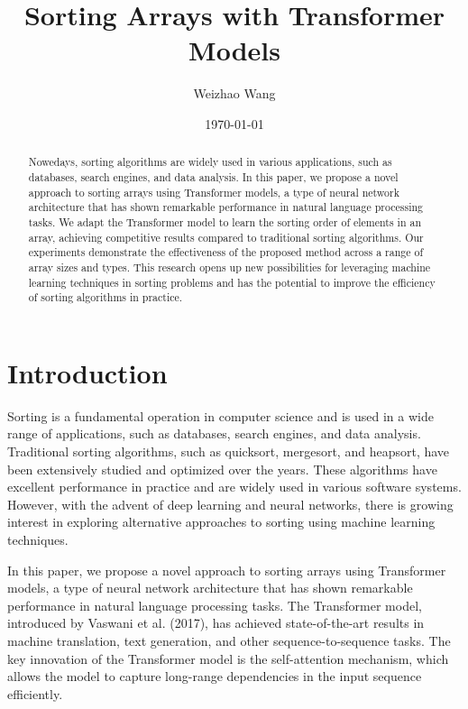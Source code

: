 \documentclass{article}
\author{Weizhao Wang}
\date{\today}
\begin{document}
\title{Sorting Arrays with Transformer Models}

\maketitle

\begin{abstract}
    Nowedays, sorting algorithms are widely used in various applications, such as databases, search engines, and data analysis. In this paper, we propose a novel approach to sorting arrays using Transformer models, a type of neural network architecture that has shown remarkable performance in natural language processing tasks. We adapt the Transformer model to learn the sorting order of elements in an array, achieving competitive results compared to traditional sorting algorithms. Our experiments demonstrate the effectiveness of the proposed method across a range of array sizes and types. This research opens up new possibilities for leveraging machine learning techniques in sorting problems and has the potential to improve the efficiency of sorting algorithms in practice.
\end{abstract}

\section{Introduction}

Sorting is a fundamental operation in computer science and is used in a wide range of applications, such as databases, search engines, and data analysis. Traditional sorting algorithms, such as quicksort, mergesort, and heapsort, have been extensively studied and optimized over the years. These algorithms have excellent performance in practice and are widely used in various software systems. However, with the advent of deep learning and neural networks, there is growing interest in exploring alternative approaches to sorting using machine learning techniques.

In this paper, we propose a novel approach to sorting arrays using Transformer models, a type of neural network architecture that has shown remarkable performance in natural language processing tasks. The Transformer model, introduced by Vaswani et al. (2017), has achieved state-of-the-art results in machine translation, text generation, and other sequence-to-sequence tasks. The key innovation of the Transformer model is the self-attention mechanism, which allows the model to capture long-range dependencies in the input sequence efficiently.
\end{document}

